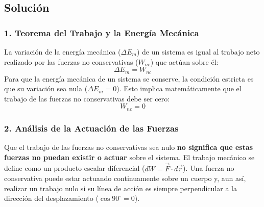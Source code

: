 \documentclass[12pt, a4paper]{article}
\begin{document}
\subsection*{Solución}

\subsubsection*{1. Teorema del Trabajo y la Energía Mecánica}
La variación de la energía mecánica ($\Delta E_m$) de un sistema es igual al trabajo neto realizado por las fuerzas no conservativas ($W_{nc}$) que actúan sobre él:
$$\Delta E_m = W_{nc}$$
Para que la energía mecánica de un sistema se conserve, la condición estricta es que su variación sea nula ($\Delta E_m = 0$). Esto implica matemáticamente que el trabajo de las fuerzas no conservativas debe ser cero:
$$W_{nc} = 0$$

\subsubsection*{2. Análisis de la Actuación de las Fuerzas}
Que el trabajo de las fuerzas no conservativas sea nulo \textbf{no significa que estas fuerzas no puedan existir o actuar} sobre el sistema. 
El trabajo mecánico se define como un producto escalar diferencial ($dW = \vec{F} \cdot d\vec{r}$). Una fuerza no conservativa puede estar actuando continuamente sobre un cuerpo y, aun así, realizar un trabajo nulo si su línea de acción es siempre perpendicular a la dirección del desplazamiento ($\cos 90^\circ = 0$).
\end{document}
